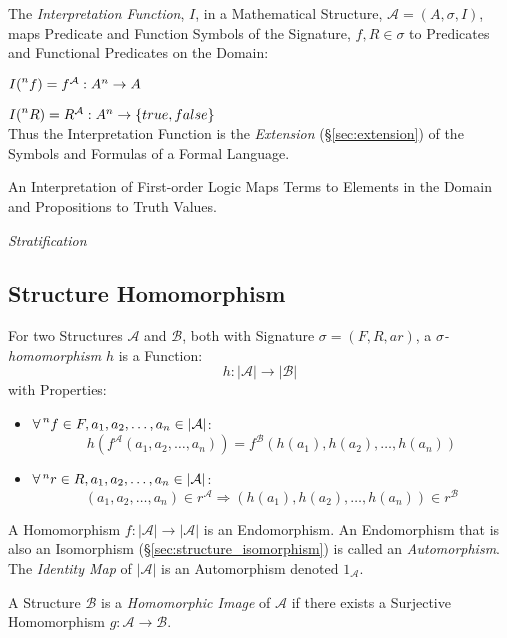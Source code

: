 The \emph{Interpretation Function}, $I$, in a Mathematical Structure,
$\mathcal{A} = (A, \sigma, I)$, maps Predicate and Function Symbols of
the Signature, $f, R \in \sigma$ to Predicates and Functional
Predicates on the Domain:

$I (\prescript{n}{}{f}) = f^{\mathcal{A}} : A^n \rightarrow A$

$I (\prescript{n}{}{R}) = R^{\mathcal{A}} : A^n \rightarrow \{true,
false\}$
\\ Thus the Interpretation Function is the \emph{Extension}
(\S\ref{sec:extension}) of the Symbols and Formulas of a Formal
Language.

An Interpretation of First-order Logic Maps Terms to Elements in the
Domain and Propositions to Truth Values.

\emph{Stratification}



\subsection{Structure Homomorphism}\label{sec:structure_homomorphism}

For two Structures $\mathcal{A}$ and $\mathcal{B}$, both with
Signature $\sigma = (F,R,ar)$, a \emph{$\sigma$-homomorphism} $h$ is a
Function:
\[
    h : |\mathcal{A}| \rightarrow |\mathcal{B}|
\]
with Properties:
\begin{itemize}
    \item $\forall \prescript{n}{}{f} \in F,
    a_1, a_2,\ldots, a_n \in |\mathcal{A}|$:
\[
    h (f^\mathcal{A}(a_1, a_2,\ldots, a_n))
    = f^\mathcal{B} (h(a_1), h(a_2),\ldots, h(a_n))
\]
    \item $\forall \prescript{n}{}{r} \in R,
    a_1, a_2,\ldots, a_n \in |\mathcal{A}|$:
\[
    (a_1,a_2,\ldots,a_n) \in r^\mathcal{A} \Rightarrow
    (h(a_1), h(a_2),\ldots,h(a_n)) \in r^\mathcal{B}
\]
\end{itemize}
A Homomorphism $f : |\mathcal{A}| \rightarrow |\mathcal{A}|$ is an
Endomorphism. An Endomorphism that is also an Isomorphism
(\S\ref{sec:structure_isomorphism}) is called an \emph{Automorphism}.
The \emph{Identity Map} of $|\mathcal{A}|$ is an Automorphism denoted
$1_\mathcal{A}$.

A Structure $\mathcal{B}$ is a \emph{Homomorphic Image} of
$\mathcal{A}$ if there exists a Surjective Homomorphism $g :
\mathcal{A} \rightarrow \mathcal{B}$.

